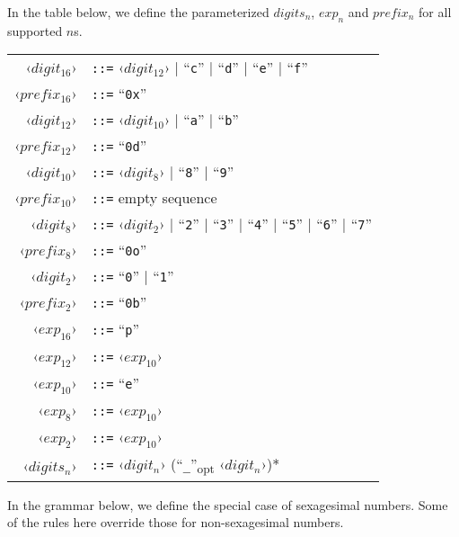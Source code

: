 In the table below, we define the parameterized $digits_n$, $exp_n$ and $prefix_n$ for all supported $n$s.

\grammar
\begin{longtable}{ r l }
  ‹$digit_{16}$› & \lstinline!::=! ‹$digit_{12}$› | ``\lstinline!c!'' | ``\lstinline!d!'' | ``\lstinline!e!'' | ``\lstinline!f!'' \\
  ‹$prefix_{16}$› & \lstinline!::=! ``\lstinline!0x!'' \\
  
  ‹$digit_{12}$› & \lstinline!::=! ‹$digit_{10}$› | ``\lstinline!a!'' | ``\lstinline!b!'' \\
  ‹$prefix_{12}$› & \lstinline!::=! ``\lstinline!0d!'' \\
  
  ‹$digit_{10}$› & \lstinline!::=! ‹$digit_8$› | ``\lstinline!8!'' | ``\lstinline!9!'' \\
  ‹$prefix_{10}$› & \lstinline!::=! empty sequence \\
  
  ‹$digit_8$› & \lstinline!::=! ‹$digit_2$› | ``\lstinline!2!'' | ``\lstinline!3!'' | ``\lstinline!4!'' | ``\lstinline!5!'' | ``\lstinline!6!'' | ``\lstinline!7!'' \\
  ‹$prefix_8$› & \lstinline!::=! ``\lstinline!0o!'' \\
  
  ‹$digit_2$› & \lstinline!::=! ``\lstinline!0!'' | ``\lstinline!1!'' \\
  ‹$prefix_2$› & \lstinline!::=! ``\lstinline!0b!'' \\
  
  ‹$exp_{16}$› & \lstinline!::=! ``\lstinline!p!'' \\
  ‹$exp_{12}$› & \lstinline!::=! ‹$exp_{10}$› \\
  ‹$exp_{10}$› & \lstinline!::=! ``\lstinline!e!'' \\
  ‹$exp_8$› & \lstinline!::=! ‹$exp_{10}$› \\
  ‹$exp_2$› & \lstinline!::=! ‹$exp_{10}$› \\
  
  ‹$digits_n$› & \lstinline!::=! ‹$digit_n$› (``\lstinline!_!''\textsubscript{opt} ‹$digit_n$›)* \\
\end{longtable}

In the grammar below, we define the special case of sexagesimal numbers. Some of the rules here override those for non-sexagesimal numbers.

